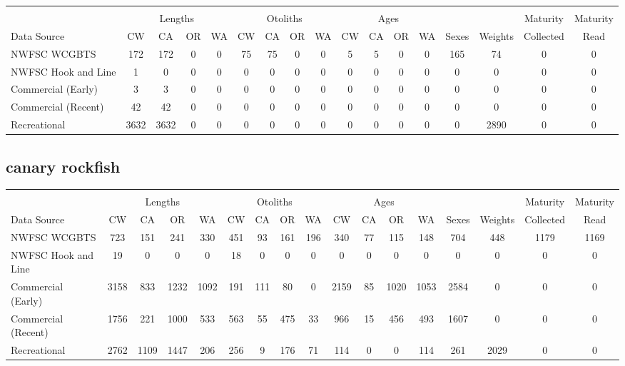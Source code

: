 \documentclass[12pt,]{article}
\begin{document}
\begin{table}[ht]
\centering
\begingroup\fontsize{10pt}{10pt}\selectfont
\begin{tabular}{|l|cccc|cccc|cccc|c|c|c|c|}
  \hline
 &  &  &  &  &  &  &  &  &  &  &  &  &  &  &  &  \\ 
   & \multicolumn{4}{c}{Lengths} &  \multicolumn{4}{c}{Otoliths} & \multicolumn{4}{c}{Ages} &  & & Maturity & Maturity\\
 Data Source & CW & CA & OR & WA & CW & CA & OR & WA & CW & CA & OR & WA & Sexes & Weights & Collected & Read\\
 \hline
NWFSC WCGBTS & 172 & 172 & 0 & 0 & 75 & 75 & 0 & 0 & 5 & 5 & 0 & 0 & 165 & 74 & 0 & 0 \\ 
  NWFSC Hook and Line & 1 & 0 & 0 & 0 & 0 & 0 & 0 & 0 & 0 & 0 & 0 & 0 & 0 & 0 & 0 & 0 \\ 
  Commercial (Early) & 3 & 3 & 0 & 0 & 0 & 0 & 0 & 0 & 0 & 0 & 0 & 0 & 0 & 0 & 0 & 0 \\ 
  Commercial (Recent) & 42 & 42 & 0 & 0 & 0 & 0 & 0 & 0 & 0 & 0 & 0 & 0 & 0 & 0 & 0 & 0 \\ 
  Recreational & 3632 & 3632 & 0 & 0 & 0 & 0 & 0 & 0 & 0 & 0 & 0 & 0 & 0 & 2890 & 0 & 0 \\ 
   \hline
\end{tabular}
\endgroup
\end{table}

\FloatBarrier  

\newpage  

\subsection{canary rockfish}\label{canary-rockfish}

\begin{table}[ht]
\centering
\begingroup\fontsize{10pt}{10pt}\selectfont
\begin{tabular}{|l|cccc|cccc|cccc|c|c|c|c|}
  \hline
 &  &  &  &  &  &  &  &  &  &  &  &  &  &  &  &  \\ 
   & \multicolumn{4}{c}{Lengths} &  \multicolumn{4}{c}{Otoliths} & \multicolumn{4}{c}{Ages} &  & & Maturity & Maturity\\
 Data Source & CW & CA & OR & WA & CW & CA & OR & WA & CW & CA & OR & WA & Sexes & Weights & Collected & Read\\
 \hline
NWFSC WCGBTS & 723 & 151 & 241 & 330 & 451 & 93 & 161 & 196 & 340 & 77 & 115 & 148 & 704 & 448 & 1179 & 1169 \\ 
  NWFSC Hook and Line & 19 & 0 & 0 & 0 & 18 & 0 & 0 & 0 & 0 & 0 & 0 & 0 & 0 & 0 & 0 & 0 \\ 
  Commercial (Early) & 3158 & 833 & 1232 & 1092 & 191 & 111 & 80 & 0 & 2159 & 85 & 1020 & 1053 & 2584 & 0 & 0 & 0 \\ 
  Commercial (Recent) & 1756 & 221 & 1000 & 533 & 563 & 55 & 475 & 33 & 966 & 15 & 456 & 493 & 1607 & 0 & 0 & 0 \\ 
  Recreational & 2762 & 1109 & 1447 & 206 & 256 & 9 & 176 & 71 & 114 & 0 & 0 & 114 & 261 & 2029 & 0 & 0 \\ 
   \hline
\end{tabular}
\endgroup
\end{table}
\end{document}
